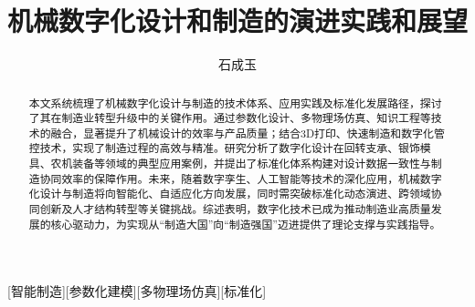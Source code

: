 \documentclass[fontset=windows,12pt,UTF8]{ctexart}
\title{机械数字化设计和制造的演进实践和展望}
\author{石成玉}
\affiliation{西北农林科技大学 \quad 机械与电子工程学院 \quad 2025级 \quad 2025056203}
\begin{document}
\maketitle

\begin{abstract}
	本文系统梳理了机械数字化设计与制造的技术体系、应用实践及标准化发展路径，探讨了其在制造业转型升级中的关键作用。通过参数化设计、多物理场仿真、知识工程等技术的融合，显著提升了机械设计的效率与产品质量；结合3D打印、快速制造和数字化管控技术，实现了制造过程的高效与精准。研究分析了数字化设计在回转支承、银饰模具、农机装备等领域的典型应用案例，并提出了标准化体系构建对设计数据一致性与制造协同效率的保障作用。未来，随着数字孪生、人工智能等技术的深化应用，机械数字化设计与制造将向智能化、自适应化方向发展，同时需突破标准化动态演进、跨领域协同创新及人才结构转型等关键挑战。综述表明，数字化技术已成为推动制造业高质量发展的核心驱动力，为实现从“制造大国”向“制造强国”迈进提供了理论支撑与实践指导。
\end{abstract}

[智能制造][参数化建模][多物理场仿真][标准化]
\end{document}
